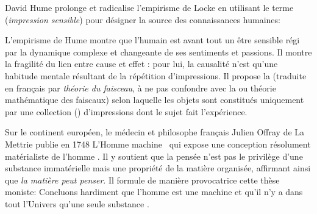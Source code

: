 David Hume prolonge et radicalise l'empirisme de Locke en utilisant le terme  (\emph{impression sensible}) pour désigner la source des connaissances humaines: 

\begin{quote}
\cite{hume_treatise_1739}
\end{quote}

L'empirisme de Hume montre que l'humain est avant tout un être sensible régi par la dynamique complexe et changeante de ses sentiments et passions.  
Il montre la fragilité du lien entre cause et effet : pour lui, la causalité n’est qu’une habitude mentale résultant de la répétition d'impressions.
Il propose la  (traduite en français par \emph{théorie du faisceau}, à ne pas confondre avec la  ou théorie mathématique des faiscaux) selon laquelle les objets sont constitués uniquement par une collection () d'impressions dont le sujet fait l'expérience.  

Sur le continent européen, le médecin et philosophe français Julien Offray de La Mettrie publie en 1748 \og L'Homme machine \fg\ qui expose une conception résolument matérialiste de l'homme \cite{la_mettrie_homme_1748}.
Il y soutient que la pensée n'est pas le privilège d'une substance immatérielle mais une propriété de la matière organisée, affirmant ainsi que \emph{la matière peut penser}.
Il formule de manière provocatrice cette thèse moniste: \og Concluons hardiment que l'homme est une machine et qu'il n'y a dans tout l'Univers qu'une seule substance \fg.

